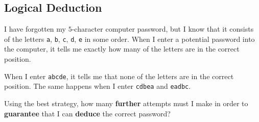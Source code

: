 \documentclass{article}
\begin{document}
\subsection{Logical Deduction}

\begin{example}[TMUA 2017 P2 Q20]
    I have forgotten my \(5\)-character computer password, but I know that it consists of the letters \texttt{a}, \texttt{b}, \texttt{c}, \texttt{d}, \texttt{e} in some order. When I enter a potential password into the computer, it tells me exactly how many of the letters are in the correct position.

    When I enter \texttt{abcde}, it tells me that none of the letters are in the correct position. The same happens when I enter \texttt{cdbea} and \texttt{eadbc}.

    Using the best strategy, how many \textbf{further} attempts must I make in order to \textbf{guarantee} that I can \textbf{deduce} the correct password?
\end{example}
\end{document}

